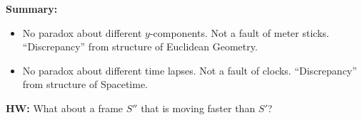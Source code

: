 \textbf{Summary:}
\begin{itemize}
  \item No paradox about different $y$-components. Not a fault of meter sticks.
    ``Discrepancy'' from structure of Euclidean Geometry.
  \item No paradox about different time lapses. Not a fault of clocks.
    ``Discrepancy'' from structure of Spacetime.
\end{itemize}

\bigskip
\textbf{HW:} What about a frame $S''$ that is moving faster than $S'$?


